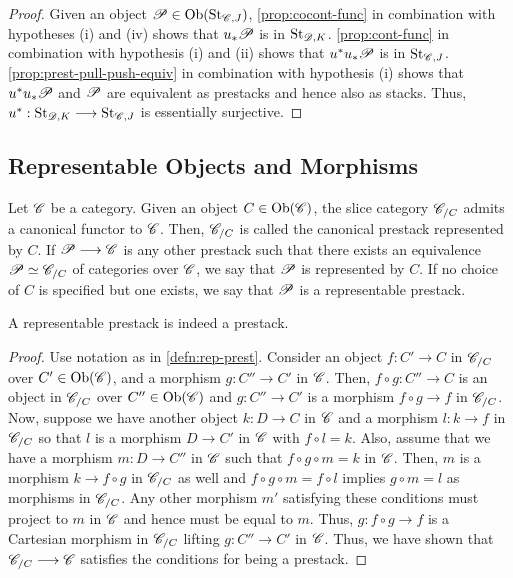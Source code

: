 \documentclass[11pt]{amsart}
\begin{document}
\begin{proof}
Given an object $\sP \in \Ob{\St_{\sC, J}}$, \cref{prop:cocont-func} in combination
with hypotheses (i) and (iv) shows that $u_*\mathscr{P}$ is in $\mathrm{St}_{\mathscr{D}, K}$.
\cref{prop:cont-func} in combination with hypothesis (i) and (ii) shows that
$u^*u_*\mathscr{P}$ is in $\mathrm{St}_{\mathscr{C}, J}$.
\cref{prop:prest-pull-push-equiv} in combination with hypothesis (i) shows that
$u^*u_*\mathscr{P}$ and $\mathscr{P}$ are equivalent as prestacks and hence also as stacks.
Thus, $u^* : \St_{\sD, K} \to \St_{\sC, J}$ is essentially surjective.
\end{proof}

\subsection{Representable Objects and Morphisms}
\label{subsec:repr-obj-morphisms}

\begin{defn}\label{defn:rep-prest}
Let $\mathscr{C}$ be a category. Given an object $C \in \Ob{\sC}$, the slice category
$\mathscr{C}_{/C}$ admits a canonical functor to $\mathscr{C}$. Then, $\mathscr{C}_{/C}$ is called the canonical prestack
represented by $C$. If $\sP \to \sC$ is any other prestack such that there exists an equivalence
$\mathscr{P} \simeq \mathscr{C}_{/C}$ of categories over $\mathscr{C}$,
we say that $\mathscr{P}$ is represented by $C$. If no choice of
$C$ is specified but one exists, we say that $\mathscr{P}$ is a representable prestack.
\end{defn}

\begin{prop}
A representable prestack is indeed a prestack.
\end{prop}
\begin{proof}
Use notation as in \cref{defn:rep-prest}. Consider an object $f : C' \to C$ in
$\mathscr{C}_{/C}$ over $C' \in \Ob{\sC}$, and a morphism $g : C'' \to C'$ in $\mathscr{C}$.
Then, $f \circ g : C'' \to C$ is an object in $\mathscr{C}_{/C}$ over $C'' \in \Ob{\sC}$
and $g : C'' \to C'$ is a morphism $f \circ g \to f$ in $\mathscr{C}_{/C}$. Now, suppose
we have another object $k : D \to C$ in $\mathscr{C}$ and a morphism $l : k \to f$ in $\mathscr{C}_{/C}$
so that $l$ is a morphism $D \to C'$ in $\mathscr{C}$ with $f \circ l = k$. Also, assume
that we have a morphism $m : D \to C''$ in $\mathscr{C}$ such that $f \circ g \circ m = k$
in $\mathscr{C}$. Then, $m$ is a morphism $k \to f \circ g$ in $\mathscr{C}_{/C}$ as well and
$f \circ g \circ m = f \circ l$ implies $g \circ m = l$ as morphisms in $\mathscr{C}_{/C}$.
Any other morphism $m'$ satisfying these conditions must project to $m$ in $\mathscr{C}$
and hence must be equal to $m$. Thus, $g : f \circ g \to f$ is a Cartesian morphism
in $\mathscr{C}_{/C}$ lifting $g : C'' \to C'$ in $\mathscr{C}$.
Thus, we have shown that $\sC_{/C} \to \sC$ satisfies the conditions for being a prestack.
\end{proof}
\end{document}
